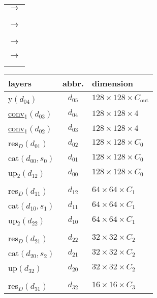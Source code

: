 \begin{center}
\begin{minipage}{0.02\textwidth}
\begin{tabular}{c}
			\\	
			$\longrightarrow$\\	
			\\	
			\\	
			\\	
			$\longrightarrow$\\	
			\\	
			\\	
			\\	
			$\longrightarrow$\\	
			\\	
			\\	
			$\longrightarrow$\\	
			\\	
			\\
		\end{tabular}
	\end{minipage}
	\hfill
	\begin{minipage}{0.55\textwidth}
		\centering
		\begin{tabular}{l|c|l}
			layers & abbr. & dimension\\
			\hline
			y$(d_{04})$ & $d_{05}$ & $128 \times 128 \times C_\text{out}$\\	
			\underline{conv}$_1(d_{03})$ & $d_{04}$ & $128 \times 128 \times 4$\\
			\underline{conv}$_1(d_{02})$ & $d_{03}$ & $128 \times 128 \times 4$\\
			res$_D(d_{01})$ & $d_{02}$ & $128 \times 128 \times C_0$\\
			cat$(d_{00},s_0)$ & $d_{01}$ & $128 \times 128 \times C_0$\\
			up$_2(d_{12})$ & $d_{00}$ & $128 \times 128 \times C_0$\\
			\hline
			&&\\
			res$_D(d_{11})$ & $d_{12}$ & $64 \times 64 \times C_1$\\
			cat$(d_{10},s_1)$ & $d_{11}$ & $64 \times 64 \times C_1$\\
			up$_2(d_{22})$ & $d_{10}$ & $64 \times 64 \times C_1$\\
			\hline
			&&\\
			res$_D(d_{21})$ & $d_{22}$ & $32 \times 32 \times C_2$\\
			cat$(d_{20},s_2)$ & $d_{21}$ & $32 \times 32 \times C_2$\\
			up$(d_{32})$ & $d_{20}$ & $32 \times 32 \times C_2$\\
			\hline
			&&\\
			res$_D(d_{31})$ & $d_{32}$ & $16 \times 16 \times C_3$\\

\end{tabular}
\end{minipage}
\end{center}
